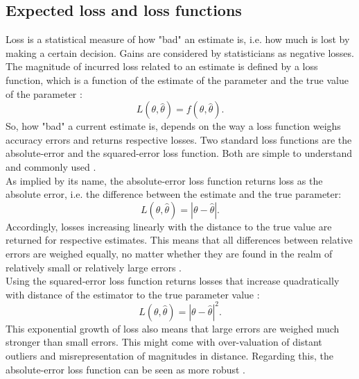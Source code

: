         \subsection{Expected loss and loss functions}\label{sec:loss} 
        Loss is a statistical measure of how "bad" an estimate is, i.e. how much is lost by making a certain decision. Gains are considered by statisticians as negative losses.
        The magnitude of incurred loss related to an estimate is defined by a loss function, which is a function of the estimate of the parameter and the true value of the parameter \citep{wald1950statistical, davidson2015}:        
        \begin{equation}\label{eq:LossFunction}
        L(\theta,\hat{\theta}) = f(\theta,\hat{\theta}).
        \end{equation}        
        So, how "bad" a current estimate is, depends on the way a loss function weighs accuracy errors and returns respective losses. Two standard loss functions are the absolute-error and the squared-error loss function. Both are simple to understand and commonly used \citep{davidson2015, hennig2007}.\\        
        As implied by its name, the absolute-error loss function returns loss as the absolute error, i.e. the difference between the estimate and the true parameter:        
        \begin{equation}\label{eq:AbsLossFunction}
        L(\theta,\hat{\theta}) = |\theta - \hat{\theta}|.
        \end{equation}                
        Accordingly, losses increasing linearly with the distance to the true value are returned for respective estimates. This means that all differences between relative errors are weighed equally, no matter whether they are found in the realm of relatively small or relatively large errors \citep{hennig2007}.\\
        Using the squared-error loss function returns losses that increase quadratically with distance of the estimator to the true parameter value \citep{davidson2015, moye2006statistical}:        
        \begin{equation}\label{eq:SqrLossFunction}
        L(\theta,\hat{\theta}) = |\theta - \hat{\theta}|^2.
        \end{equation}         
        This exponential growth of loss also means that large errors are weighed much stronger than small errors. This might come with over-valuation of distant outliers and misrepresentation of magnitudes in distance. Regarding this, the absolute-error loss function can be seen as more robust \citep{davidson2015}.

